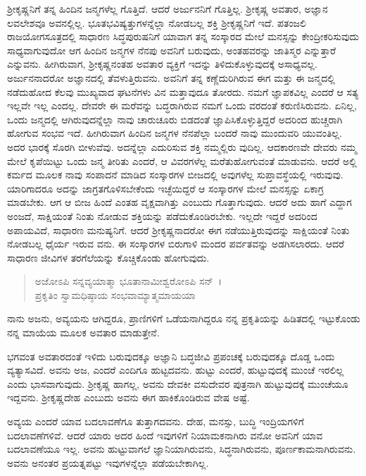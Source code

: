 ಶ‍್ರೀಕೃಷ್ಣನಿಗೆ ತನ್ನ ಹಿಂದಿನ ಜನ್ಮಗಳೆಲ್ಲ ಗೊತ್ತಿದೆ. ಆದರೆ ಅರ್ಜುನನಿಗೆ ಗೊತ್ತಿಲ್ಲ. ಶ‍್ರೀಕೃಷ್ಣ ಅವತಾರ, ಅಜ್ಞಾನ ಲವಲೇಶವೂ ಅವನಲ್ಲಿಲ್ಲ. ಭೂತಭವಿಷ್ಯತ್ತುಗಳನ್ನೆಲ್ಲಾ ನೋಡಬಲ್ಲ ಶಕ್ತಿ ಶ‍್ರೀಕೃಷ್ಣನಿಗೆ ಇದೆ. ಪತಂಜಲಿ ರಾಜಯೋಗಸೂತ್ರದಲ್ಲಿ ಸಾಧಾರಣ ಸಿದ್ಧಪುರುಷನಿಗೆ ಯಾವಾಗ ತನ್ನ ಸಂಸ್ಕಾರದ ಮೇಲೆ ಮನಸ್ಸನ್ನು ಕೇಂದ್ರೀಕರಿಸುವುದು ಸಾಧ್ಯವಾಗುವುದೋ ಆಗ ಹಿಂದಿನ ಜನ್ಮಗಳ ನೆನಪು ಅವನಿಗೆ ಬರುವುದು, ಅಂತಹವರನ್ನು ಜಾತಿಸ್ಮರ ಎನ್ನುತ್ತಾರೆ ಎನ್ನುವನು. ಹೀಗಿರುವಾಗ, ಶ‍್ರೀಕೃಷ್ಣನಂತಹ ಅವತಾರ ವ್ಯಕ್ತಿಗೆ ಇದನ್ನು ತಿಳಿದುಕೊಳ್ಳುವುದಕ್ಕೆ ಅಸಾಧ್ಯವಲ್ಲ. ಅರ್ಜುನನಾದರೋ ಅಜ್ಞಾನದಲ್ಲಿ ತೆವಳುತ್ತಿರುವನು. ಅವನಿಗೆ ತನ್ನ ಕಣ್ಣೆದುರಿಗಿರುವ ಈಗ ಮತ್ತು ಈ ಜನ್ಮದಲ್ಲಿ ನಡೆದುಹೋದ ಕೆಲವು ಮುಖ್ಯವಾದ ಘಟನೆಗಳು ವಿನ ಮತ್ತಾವುದೂ ತೋರದು. ನಮಗೆ ಜ್ಞಾಪಕವಿಲ್ಲ ಎಂದರೆ ಆ ಸತ್ಯ ಇಲ್ಲವೇ ಇಲ್ಲ ಎಂದಲ್ಲ. ದೇವರೇ ಈ ಮರೆವನ್ನು ಬದ್ಧರಾಗಿರುವ ನಮಗೆ ಒಂದು ವರದಂತೆ ಕರುಣಿಸಿರುವನು. ಏನಿಲ್ಲ, ಒಂದು ಜನ್ಮದಲ್ಲಿ ಆಗಿರುವುದನ್ನೆಲ್ಲಾ ನಾವು ಚಾರುಚೂರು ಬಿಡದಂತೆ ಜ್ಞಾಪಿಸಿಕೊಳ್ಳುತ್ತಿದ್ದರೆ ಅದರಿಂದ ಹುಚ್ಚರಾಗಿ ಹೋಗುವ ಸಂಭವ ಇದೆ. ಹೀಗಿರುವಾಗ ಹಿಂದಿನ ಜನ್ಮಗಳ ನೆನಪೆಲ್ಲಾ ಬಂದರೆ ನಾವು ಮುಂದುವರಿ ಯುವಂತಿಲ್ಲ. ಅದರ ಭಾರಕ್ಕೆ ಸೊರಗಿ ಬೀಳುವೆವು. ಅದನ್ನೆಲ್ಲಾ ಎದುರಿಸುವ ಶಕ್ತಿ ನಮ್ಮಲ್ಲಿರು ವುದಿಲ್ಲ. ಆದಕಾರಣವೇ ದೇವರು ನಮ್ಮ ಮೇಲೆ ಕೃಪೆಯಿಟ್ಟು ಒಂದು ಜನ್ಮ ತೀರಿತು ಎಂದರೆ, ಆ ವಿವರಗಳೆಲ್ಲ ಮರೆತುಹೋಗುವಂತೆ ಮಾಡುವನು. ಆದರೆ ಅಲ್ಲಿ ಕರ್ಮದ ಮೂಲಕ ನಾವು ಸಂಪಾದನೆ ಮಾಡಿದ ಸಂಸ್ಕಾರಗಳ ಬೀಜದಲ್ಲಿ ಅವುಗಳೆಲ್ಲ ಸುಪ್ತಾವಸ್ಥೆಯಲ್ಲಿ ಇರುವುವು. ಯಾರಿಗಾದರೂ ಅದನ್ನು ಜಾಗ್ರತಗೊಳಿಸಬೇಕೆಂದು ಇಚ್ಛೆಯಿದ್ದರೆ ಆ ಸಂಸ್ಕಾರಗಳ ಮೇಲೆ ಮನಸ್ಸನ್ನು ಏಕಾಗ್ರ ಮಾಡಬೇಕು. ಆಗ ಆ ಬೀಜ ಹಿಂದೆ ಎಂತಹ ವೃಕ್ಷವಾಗಿತ್ತು ಎಂಬುದು ಗೊತ್ತಾಗುವುದು. ಆದರೆ ಅದು ಹಾಗೆ ಎದ್ದಾಗ ಅಂಜದೆ, ಸಾಕ್ಷಿಯಂತೆ ನಿಂತು ನೋಡುವ ಶಕ್ತಿಯನ್ನು ಪಡೆದುಕೊಂಡಿರಬೇಕು. ಇಲ್ಲದೇ ಇದ್ದರೆ ಅದರಿಂದ ಅಪಾಯವಿದೆ, ಸಾಧಾರಣ ಮನುಷ್ಯನಿಗೆ. ಆದರೆ ಶ‍್ರೀಕೃಷ್ಣನಾದರೋ ಈಗ ನಡೆಯುತ್ತಿರುವುದನ್ನು ಸಾಕ್ಷಿಯಂತೆ ನಿಂತು ನೋಡಬಲ್ಲ ಧೈರ್ಯ ಇರುವ ವನು. ಈ ಸಂಸ್ಕಾರಗಳ ಬಿರುಗಾಳಿ ಮಂದರ ಪರ್ವತವನ್ನು ಅಡಗಿಸಲಾರದು. ಆದರೆ ಸಾಧಾರಣ ಜೀವಿಗಳ ತರಗೆಲೆಯನ್ನು ಕೊಚ್ಚಿಕೊಂಡು ಹೋಗುವುದು.

\begin{verse}
ಅಜೋಽಪಿ ಸನ್ನವ್ಯಯಾತ್ಮಾ ಭೂತಾನಾಮೀಶ್ವರೋಽಪಿ ಸನ್​~।\\ಪ್ರಕೃತಿಂ ಸ್ವಾಮಧಿಷ್ಠಾಯ ಸಂಭವಾಮ್ಯಾತ್ಮಮಾಯಯಾ 
\end{verse}

{\small ನಾನು ಅಜನು, ಅವ್ಯಯನು ಆಗಿದ್ದರೂ, ಪ್ರಾಣಿಗಳಿಗೆ ಒಡೆಯನಾಗಿದ್ದರೂ ನನ್ನ ಪ್ರಕೃತಿಯನ್ನು ಹಿಡಿತದಲ್ಲಿ ಇಟ್ಟುಕೊಂಡು ನನ್ನ ಮಾಯೆಯ ಮೂಲಕ ಅವತಾರ ಮಾಡುತ್ತೇನೆ.}

ಭಗವಂತ ಅವತಾರದಂತೆ ಇಳಿದು ಬರುವುದಕ್ಕೂ ಅಜ್ಞಾನಿ ಬದ್ಧಜೀವಿ ಪ್ರಪಂಚಕ್ಕೆ ಬರುವುದಕ್ಕೂ ದೊಡ್ಡ ಒಂದು ವ್ಯತ್ಯಾಸವಿದೆ. ಅವನು ಅಜ, ಎಂದರೆ ಎಂದಿಗೂ ಹುಟ್ಟದವನು. ಹುಟ್ಟು ಎಂದರೆ, ಹುಟ್ಟುವುದಕ್ಕೆ ಮುಂಚೆ ಇರಲಿಲ್ಲ ಎಂದು ಭಾಸವಾಗುವುದು. ಶ‍್ರೀಕೃಷ್ಣ ಹಾಗಲ್ಲ, ಅವನು ದೇವಕೀ ವಸುದೇವರ ಪುತ್ರನಾಗಿ ಹುಟ್ಟುವುದಕ್ಕೆ ಮುಂಚೆಯೂ ಇದ್ದವನು. ಶ‍್ರೀಕೃಷ್ಣದೇಹ ಎಂಬುದು ಅವನು ಈಗ ಹಾಕಿಕೊಂಡಿರುವ ವೇಷ ಅಷ್ಟೆ.

ಅವ್ಯಯ ಎಂದರೆ ಯಾವ ಬದಲಾವಣೆಗೂ ತುತ್ತಾಗದವನು. ದೇಹ, ಮನಸ್ಸು, ಬುದ್ಧಿ ಇಂದ್ರಿಯಗಳಿಗೆ ಬದಲಾವಣೆಗಳಿವೆ. ಆದರೆ ಯಾರು ಅದರ ಹಿಂದೆ ಇವುಗಳಿಗೆ ನಿಯಾಮಕನಾಗಿರು ವನೋ ಅವನಿಗೆ ಯಾವ ಬದಲಾವಣೆಯೂ ಇಲ್ಲ. ಅವನು ಹುಟ್ಟುವಾಗಲೆ ಜ್ಞಾನಿಯಾಗಿರುವನು, ಸಿದ್ಧನಾಗಿರುವನು, ಪೂರ್ಣಕಾಮನಾಗಿರುವನು. ಅವನು ಅನಂತರ ಪ್ರಯತ್ನಪಟ್ಟು ಇವುಗಳನ್ನೆಲ್ಲಾ ಪಡೆಯಬೇಕಾಗಿಲ್ಲ.

